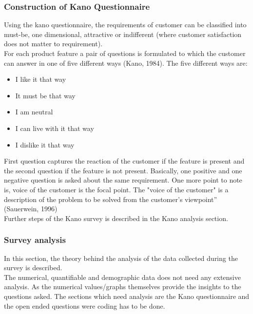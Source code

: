 \subsubsection{Construction of Kano Questionnaire}
Using the kano questionnaire, the requirements of customer can be classified into must-be, one dimensional, attractive or indifferent (where customer satisfaction does not matter to requirement). \\

For each product feature a pair of questions is formulated to which the customer can answer in one of five different ways (Kano, 1984). The five different ways are:\\
\begin{itemize}
    \item I like it that way
    \item It must be that way
    \item I am neutral 
    \item I can live with it that way 
    \item I dislike it that way\\
\end{itemize}
First question captures the reaction of the customer if the feature is present and the second question if the feature is not present. Basically, one positive and one negative question is asked about the same requirement. One more point to note is, voice of the customer is the focal point. The "voice of the customer" is a description of the problem to be solved from the customer’s viewpoint” (Sauerwein, 1996) \\

Further steps of the Kano survey is described in the Kano analysis section.\\

\subsubsection{Survey analysis}
In this section, the theory behind the analysis of the data collected during the survey is described.\\

The numerical, quantifiable and demographic data does not need any extensive analysis. As the numerical values/graphs themselves provide the insights to the questions asked. The sections which need analysis are the Kano questionnaire and the open ended questions were coding has to be done.\\

